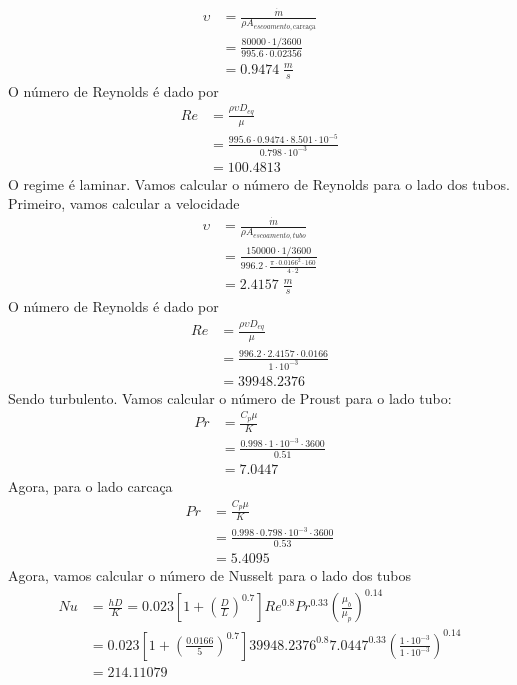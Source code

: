 \begin{align}
    \upsilon &= \frac{\dot{m}}{\rho A_{escoamento, \text{carcaça}}}\\
    &= \frac{80000 \cdot 1/3600}{995.6 \cdot 0.02356}\\
    &= 0.9474 \; \frac{m}{s}
\end{align}
O número de Reynolds é dado por
\begin{align}
    Re &= \frac{\rho \upsilon D_{eq} }{\mu }\\
    &= \frac{995.6 \cdot 0.9474 \cdot 8.501 \cdot 10^{-5}}{0.798 \cdot 10^{-3}}\\
    &= 100.4813
\end{align}
O regime é laminar. Vamos calcular o número de Reynolds para o lado dos tubos. Primeiro, vamos
calcular a velocidade
\begin{align}
    \upsilon &= \frac{\dot{m}}{\rho A_{escoamento, tubo}}\\
    &= \frac{150000 \cdot 1/3600}{996.2 \cdot \frac{\pi \cdot 0.0166^{2} \cdot 160}{4 \cdot 2}}\\
    &= 2.4157 \; \frac{m}{s}
\end{align}
O número de Reynolds é dado por
\begin{align}
    Re &= \frac{\rho \upsilon D_{eq} }{\mu }\\
    &= \frac{996.2 \cdot 2.4157 \cdot 0.0166}{1 \cdot 10^{-3}}\\
    &= 39948.2376
\end{align}
Sendo turbulento. Vamos calcular o número de Proust para o lado tubo:
\begin{align}
    Pr &= \frac{C_{p} \mu}{K}\\
    &= \frac{0.998 \cdot 1 \cdot 10^{-3} \cdot 3600}{0.51}\\
    &= 7.0447
\end{align}
Agora, para o lado carcaça
\begin{align}
    Pr &= \frac{C_{p} \mu}{K}\\
    &= \frac{0.998 \cdot 0.798 \cdot 10^{-3} \cdot 3600}{0.53}\\
    &= 5.4095
\end{align}
Agora, vamos calcular o número de Nusselt para o lado dos tubos
\begin{align}
    Nu &= \frac{hD}{K} = 0.023 \left[ 1 + \left( \frac{D}{L} \right) ^{0.7}  \right] Re^{0.8} Pr^{0.33} \left( \frac{\mu _{b} }{\mu _{p} } \right) ^{0.14}\\
    &= 0.023 \left[ 1 + \left( \frac{0.0166}{5} \right) ^{0.7}  \right] 39948.2376^{0.8} 7.0447^{0.33} \left( \frac{1 \cdot 10^{-3}}{1 \cdot 10^{-3}} \right) ^{0.14}\\
    &= 214.11079 
\end{align}
